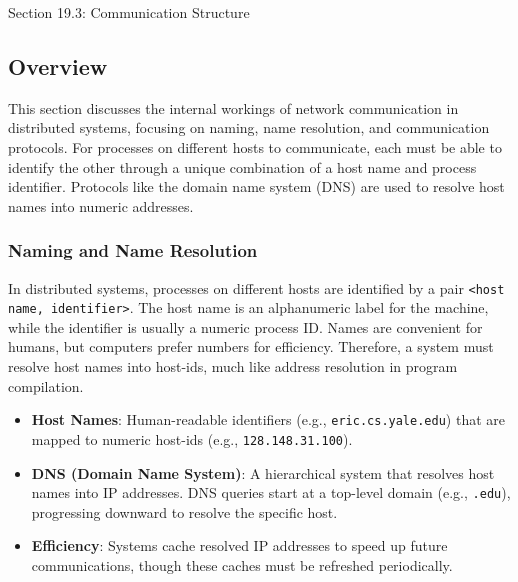 \begin{notes}{Section 19.3: Communication Structure}
    \subsection*{Overview}

    This section discusses the internal workings of network communication in distributed systems, focusing on naming, name resolution, and communication protocols. For processes on different hosts to 
    communicate, each must be able to identify the other through a unique combination of a host name and process identifier. Protocols like the domain name system (DNS) are used to resolve host names 
    into numeric addresses.
    
    \subsubsection*{Naming and Name Resolution}
    
    In distributed systems, processes on different hosts are identified by a pair \texttt{<host name, identifier>}. The host name is an alphanumeric label for the machine, while the identifier is 
    usually a numeric process ID. Names are convenient for humans, but computers prefer numbers for efficiency. Therefore, a system must resolve host names into host-ids, much like address resolution 
    in program compilation.
    
    \begin{highlight}
    
        \begin{itemize}
            \item \textbf{Host Names}: Human-readable identifiers (e.g., \texttt{eric.cs.yale.edu}) that are mapped to numeric host-ids (e.g., \texttt{128.148.31.100}).
            \item \textbf{DNS (Domain Name System)}: A hierarchical system that resolves host names into IP addresses. DNS queries start at a top-level domain (e.g., \texttt{.edu}), progressing downward 
            to resolve the specific host.
            \item \textbf{Efficiency}: Systems cache resolved IP addresses to speed up future communications, though these caches must be refreshed periodically.
        \end{itemize}
    
    \end{highlight}
    

\end{notes}
